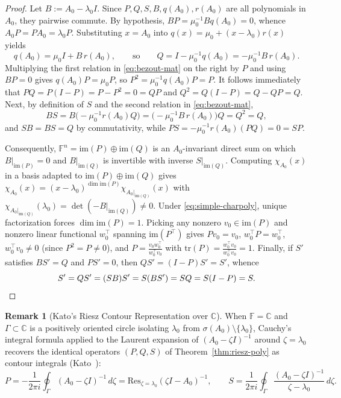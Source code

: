 \documentclass[11pt,a4paper]{article}
\theoremstyle{definition}
\newtheorem{remark}[theorem]{Remark}
\newcommand{\tr}{\mathrm{tr}}
\newcommand{\im}{\mathrm{im}}
\newcommand{\Res}{\mathrm{Res}}
\begin{document}
\begin{proof}
Let $B := A_0 - \lambda_0 I$. Since $P, Q, S, B, q(A_0), r(A_0)$ are all polynomials in
$A_0$, they pairwise commute. By hypothesis, $B P = \mu_0^{-1} B q(A_0) = 0$, whence
$A_0 P = P A_0 = \lambda_0 P$. Substituting $x = A_0$ into $q(x) = \mu_0 +
(x - \lambda_0) r(x)$ yields
\begin{equation}\label{eq:bezout-mat}
  q(A_0) = \mu_0 I + B\, r(A_0),
  \qquad\text{so}\qquad
  Q = I - \mu_0^{-1} q(A_0) = -\mu_0^{-1} B\, r(A_0).
\end{equation}
Multiplying the first relation in \eqref{eq:bezout-mat} on the right by $P$ and using
$B P = 0$ gives $q(A_0) P = \mu_0 P$, so $P^2 = \mu_0^{-1} q(A_0) P = P$. It follows
immediately that $PQ = P(I - P) = P - P^2 = 0 = QP$ and $Q^2 = Q(I - P) = Q - QP = Q$.
Next, by definition of $S$ and the second relation in \eqref{eq:bezout-mat},
\[
  B S = B\bigl(-\mu_0^{-1} r(A_0) Q\bigr) = \bigl(-\mu_0^{-1} B\, r(A_0)\bigr) Q
  = Q^2 = Q,
\]
and $S B = B S = Q$ by commutativity, while $P S = -\mu_0^{-1} r(A_0)(PQ) = 0 = S P$.

Consequently, $\mathbb{F}^n = \im(P) \oplus \im(Q)$ is an $A_0$-invariant direct sum
on which $B|_{\im(P)} = 0$ and $B|_{\im(Q)}$ is invertible with inverse $S|_{\im(Q)}$.
Computing $\chi_{A_0}(x)$ in a basis adapted to $\im(P) \oplus \im(Q)$ gives
$\chi_{A_0}(x) = (x - \lambda_0)^{\dim\im(P)} \chi_{A_0|_{\im(Q)}}(x)$ with
$\chi_{A_0|_{\im(Q)}}(\lambda_0) = \det(-B|_{\im(Q)}) \neq 0$. Under
\eqref{eq:simple-charpoly}, unique factorization forces $\dim\im(P) = 1$. Picking any
nonzero $v_0 \in \im(P)$ and nonzero linear functional $w_0^\top$ spanning $\im(P^\top)$
gives $P v_0 = v_0$, $w_0^\top P = w_0^\top$, $w_0^\top v_0 \neq 0$ (since $P^2 = P
\neq 0$), and $P = \frac{v_0 w_0^\top}{w_0^\top v_0}$ with $\tr(P) =
\frac{w_0^\top v_0}{w_0^\top v_0} = 1$. Finally, if $S'$ satisfies $B S' = Q$ and
$P S' = 0$, then $Q S' = (I - P) S' = S'$, whence
\[
  S' = Q S' = (S B) S' = S (B S') = S Q = S(I - P) = S. \qedhere
\]
\end{proof}

\begin{remark}[Kato's Riesz Contour Representation over $\mathbb{C}$]\label{rem:contour}
When $\mathbb{F} = \mathbb{C}$ and $\Gamma \subset \mathbb{C}$ is a positively oriented
circle isolating $\lambda_0$ from $\sigma(A_0) \setminus \{\lambda_0\}$, Cauchy's
integral formula applied to the Laurent expansion of $(A_0 - \zeta I)^{-1}$ around
$\zeta = \lambda_0$ recovers the identical operators $(P, Q, S)$ of
Theorem~\ref{thm:riesz-poly} as contour integrals (Kato~\cite[Ch.~II, \S1.4--\S1.5]{Kato1995}):
\[
  P = -\frac{1}{2\pi i} \oint_\Gamma (A_0 - \zeta I)^{-1}\, d\zeta
    = \Res_{\zeta = \lambda_0}(\zeta I - A_0)^{-1}, \qquad
  S = \frac{1}{2\pi i} \oint_\Gamma \frac{(A_0 - \zeta I)^{-1}}{\zeta - \lambda_0}\, d\zeta.
\]
\end{remark}
\end{document}
